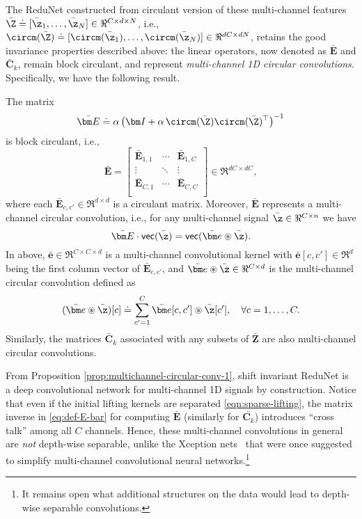 \documentclass[../../book-main.tex]{subfiles}
\begin{document}
The ReduNet constructed from circulant version of these multi-channel features $\bar\Z \doteq [\bar \z_1, \ldots, \bar \z_N] \in \Re^{C \times d \times N}$, i.e., $\circm(\bar\Z) \doteq [ \circm(\bar\z_1), \dots, \circm(\bar\z_N)] \in \Re^{dC \times dN}$, retains the good invariance properties described above: the linear operators, now denoted as $\bar{\bm E}$ and $\bar{\bm C}_k$, remain block circulant, and represent {\em multi-channel 1D circular convolutions. }
Specifically, we have the following result.
\begin{proposition}
The matrix 
\begin{equation}
\label{eq:def-E-bar}
\bar{\bm E} \doteq \alpha\left(\bm I + \alpha\, \circm(\bar\Z) \circm(\bar\Z)^\top \right) ^{-1}  
\end{equation}
is block circulant, i.e.,
\begin{equation*}
    \bar{\bm E} = 
    \left[\begin{matrix}
        \bar{\bm E}_{1, 1} & \cdots & \bar{\bm E}_{1, C}\\
        \vdots & \ddots & \vdots \\
        \bar{\bm E}_{C, 1} & \cdots & \bar{\bm E}_{C, C}\\
    \end{matrix}\right] \in \Re^{dC \times dC},
\end{equation*}
where each $\bar{\bm E}_{c, c'}\in \Re^{d \times d}$ is a circulant matrix. Moreover, $\bar{\bm E}$ represents a multi-channel circular convolution, i.e., for any multi-channel signal $\bar\z \in \Re^{C \times n}$ we have 
$$\bar{\bm E} \cdot \textsf{vec}(\bar\z) = \textsf{vec}( \bar{\bm e} \circledast \bar\z).$$ 
In above, $\bar{\bm e} \in \Re^{C \times C \times d}$ is a multi-channel convolutional kernel with $\bar{\bm e}[c, c'] \in \Re^{d}$ being the first column vector of $\bar{\bm E}_{c, c'}$, and $\bar{\bm e} \circledast \bar\z \in \Re^{C \times d}$ is the multi-channel circular convolution defined as
\begin{equation*}
    (\bar{\bm e} \circledast \bar\z)[c] \doteq \sum_{c'=1}^C \bar{\bm e}[c, c'] \circledast \bar{\z}[c'], \quad \forall c = 1, \ldots, C.
\end{equation*}
Similarly, the matrices $\bar{\bm C}_k$ associated with any subsets of $\bar{\bm Z}$ are also multi-channel circular convolutions. 
\label{prop:multichannel-circular-conv-1}
\end{proposition}
From Proposition \ref{prop:multichannel-circular-conv-1}, shift invariant ReduNet is a deep convolutional network for multi-channel 1D signals by construction. Notice that even if the initial lifting kernels are separated \eqref{eqn:sparse-lifting}, the matrix inverse  in \eqref{eq:def-E-bar} for computing $\bar{\bm E}$ (similarly for $\bar{\bm C_k}$) introduces ``cross talk'' among all $C$ channels. %
Hence, these multi-channel convolutions in general are {\em not} depth-wise separable, unlike the  Xception nets~\cite{Xception} that were once suggested to simplify multi-channel convolutional neural networks.\footnote{It remains open what additional structures on the data would lead to depth-wise separable convolutions.} 
\end{document}
